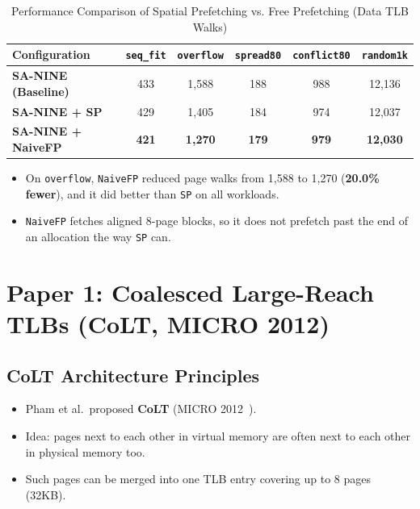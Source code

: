 \begin{table}[H]
\centering
\small
\caption{Performance Comparison of Spatial Prefetching vs. Free Prefetching (Data TLB Walks)}
\label{tab:prefetcher_sweep}
\begin{tabularx}{\textwidth}{lccccc}
\toprule
\textbf{Configuration} & \textbf{\texttt{seq\_fit}} & \textbf{\texttt{overflow}} & \textbf{\texttt{spread80}} & \textbf{\texttt{conflict80}} & \textbf{\texttt{random1k}} \\
\midrule
\textbf{SA-NINE (Baseline)} & 433 & 1,588 & 188 & 988 & 12,136 \\
\textbf{SA-NINE + SP} & 429 & 1,405 & 184 & 974 & 12,037 \\
\textbf{SA-NINE + NaiveFP} & \textbf{421} & \textbf{1,270} & \textbf{179} & \textbf{979} & \textbf{12,030} \\
\bottomrule
\end{tabularx}
\end{table}

\begin{itemize}
    \item On \texttt{overflow}, \texttt{NaiveFP} reduced page walks from 1,588 to 1,270 (\textbf{20.0\% fewer}), and it did better than \texttt{SP} on all workloads.
    \item \texttt{NaiveFP} fetches aligned 8-page blocks, so it does not prefetch past the end of an allocation the way \texttt{SP} can.
\end{itemize}

\section{Paper 1: Coalesced Large-Reach TLBs (CoLT, MICRO 2012)}

\subsection{CoLT Architecture Principles}
\begin{itemize}
    \item Pham et al.\ proposed \textbf{CoLT} (MICRO 2012~\cite{pham2012colt}).
    \item Idea: pages next to each other in virtual memory are often next to each other in physical memory too.
    \item Such pages can be merged into one TLB entry covering up to 8 pages (32KB).
\end{itemize}

